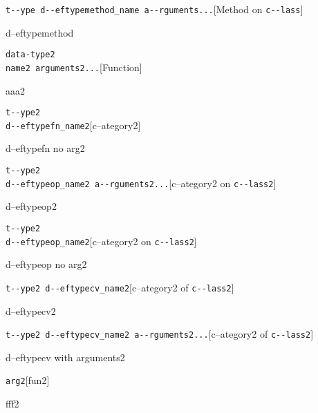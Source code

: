 \documentclass{book}
\begin{document}
\begin{titlepage}
\noindent\texttt{t{-}{-}ype d{-}{-}eftypemethod\_name a{-}{-}rguments...}\hfill[Method on \texttt{c{-}{-}lass}]



%
d--eftypemethod


\noindent\texttt{data-type2\leavevmode{}\\name2 arguments2...}\hfill[Function]



%
aaa2

\noindent\texttt{t{-}{-}ype2\leavevmode{}\\d{-}{-}eftypefn\_name2}\hfill[c--ategory2]



%
d--eftypefn no arg2

\noindent\texttt{t{-}{-}ype2\leavevmode{}\\d{-}{-}eftypeop\_name2 a{-}{-}rguments2...}\hfill[c--ategory2 on \texttt{c{-}{-}lass2}]



%
d--eftypeop2

\noindent\texttt{t{-}{-}ype2\leavevmode{}\\d{-}{-}eftypeop\_name2}\hfill[c--ategory2 on \texttt{c{-}{-}lass2}]



%
d--eftypeop no arg2

\noindent\texttt{t{-}{-}ype2 d{-}{-}eftypecv\_name2}\hfill[c--ategory2 of \texttt{c{-}{-}lass2}]



%
d--eftypecv2

\noindent\texttt{t{-}{-}ype2 d{-}{-}eftypecv\_name2 a{-}{-}rguments2...}\hfill[c--ategory2 of \texttt{c{-}{-}lass2}]



%
d--eftypecv with arguments2

\noindent\texttt{arg2}\hfill[fun2]



%
fff2



\end{titlepage}
\end{document}
